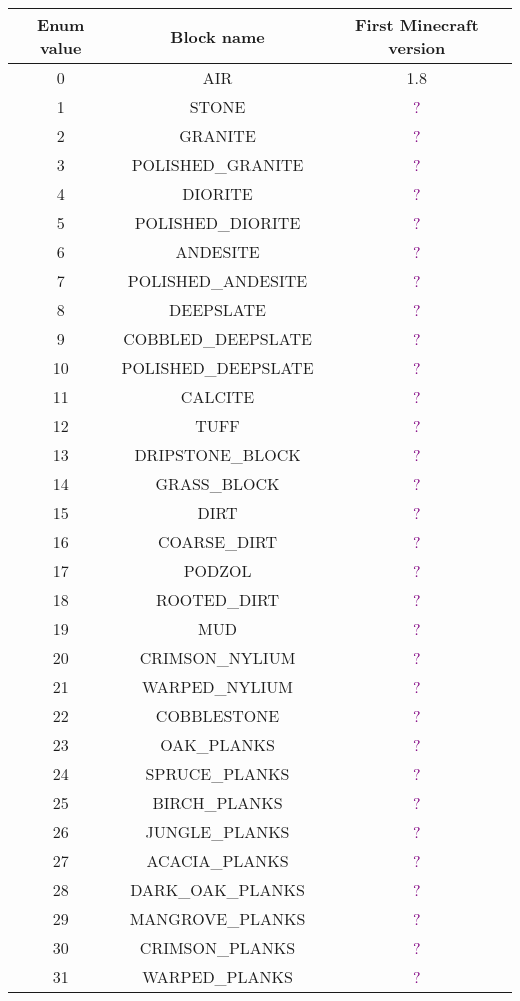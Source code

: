\documentclass[11pt]{article}
\newcommand\myworries[1]{\textcolor{purple}{#1}}
\begin{document}
\begin{longtable}{ |c|c|c| }
	\hline
	Enum value & Block name & First Minecraft version \\
	\hline
	\endhead
	0 & AIR & 1.8 \\
	1 & STONE & \myworries{?} \\
	2 & GRANITE & \myworries{?} \\
	3 & POLISHED\_GRANITE & \myworries{?} \\
	4 & DIORITE & \myworries{?} \\
	5 & POLISHED\_DIORITE & \myworries{?} \\
	6 & ANDESITE & \myworries{?} \\
	7 & POLISHED\_ANDESITE & \myworries{?} \\
	8 & DEEPSLATE & \myworries{?} \\
	9 & COBBLED\_DEEPSLATE & \myworries{?} \\
	10 & POLISHED\_DEEPSLATE & \myworries{?} \\
	11 & CALCITE & \myworries{?} \\
	12 & TUFF & \myworries{?} \\
	13 & DRIPSTONE\_BLOCK & \myworries{?} \\
	14 & GRASS\_BLOCK & \myworries{?} \\
	15 & DIRT & \myworries{?} \\
	16 & COARSE\_DIRT & \myworries{?} \\
	17 & PODZOL & \myworries{?} \\
	18 & ROOTED\_DIRT & \myworries{?} \\
	19 & MUD & \myworries{?} \\
	20 & CRIMSON\_NYLIUM & \myworries{?} \\
	21 & WARPED\_NYLIUM & \myworries{?} \\
	22 & COBBLESTONE & \myworries{?} \\
	23 & OAK\_PLANKS & \myworries{?} \\
	24 & SPRUCE\_PLANKS & \myworries{?} \\
	25 & BIRCH\_PLANKS & \myworries{?} \\
	26 & JUNGLE\_PLANKS & \myworries{?} \\
	27 & ACACIA\_PLANKS & \myworries{?} \\
	28 & DARK\_OAK\_PLANKS & \myworries{?} \\
	29 & MANGROVE\_PLANKS & \myworries{?} \\
	30 & CRIMSON\_PLANKS & \myworries{?} \\
	31 & WARPED\_PLANKS & \myworries{?} \\

\end{longtable}
\end{document}
